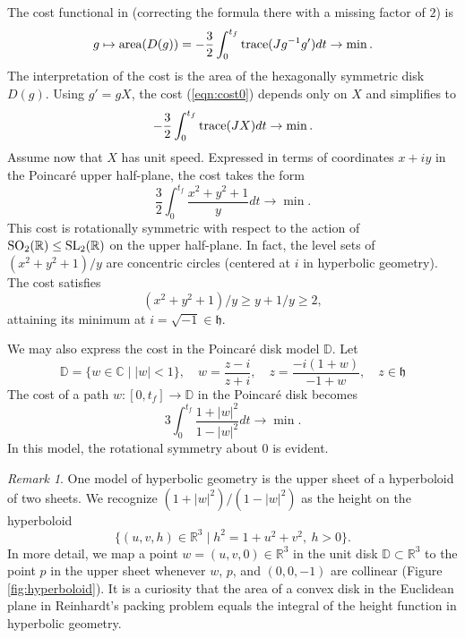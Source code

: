 \documentclass{article}
\theoremstyle{remark}
\newtheorem{remark}[equation]{Remark}%
\newcommand{\ring}[1]{\mathbb{#1}}
\newcommand{\op}[1]{\hbox{#1}}
\def\SL{\op{SL}_2(\ring{R})}
\def\SO{\op{SO}_2(\ring{R})}
\def\h{\mathfrak h}
\def\D{\ring{D}}
\begin{document}
The cost functional in \cite[\S5.1]{hales2011reinhardt} (correcting
the formula there with a missing factor of $2$) is
\begin{equation}\label{eqn:cost0}
g\mapsto \op{area}(D(g))= -\frac{3}{2}\int_0^{t_f} \op{trace} (J g^{-1} g') dt \to\min.
\end{equation}
The interpretation of the cost is the area of the hexagonally
symmetric disk $D(g)$.  Using $g' = g X$, the cost (\ref{eqn:cost0})
depends only on $X$ and simplifies to
\begin{equation}\label{eqn:cost-JX}
 -\frac{3}{2}\int_0^{t_f} 
 \op{trace}(J X) dt  \to \min.
\end{equation}
Assume now that $X$ has unit speed.
Expressed in terms of coordinates $x + i y$ in the Poincar\'e upper
half-plane, the cost takes the form
\begin{equation}\label{eqn:cost-upper}
\frac{3}{2} \int_0^{t_f} \frac{x^2 + y^2 + 1}{y} dt\to \min.
\end{equation}
This cost is rotationally symmetric with respect to the action of
$\SO\le \SL$ on the upper half-plane.  In fact, the
level sets of $(x^2 + y^2 + 1)/y$ are concentric circles (centered at
$i$ in hyperbolic geometry).  The cost satisfies
\begin{equation}\label{eqn:cost-min}
(x^2 + y^2 + 1)/y \ge y + 1/y \ge 2,
\end{equation}
attaining its minimum at $i = \sqrt{-1}\in \h$.

We may also express the cost in the Poincar\'e disk model $\D$.  Let
\[
\D=\{w\in\ring{C} \mid |w| < 1\},\quad 
w = \frac{z - i}{z + i},\quad z = \frac{-i(1+w)}{-1+w},\quad z\in\h
\]
The cost of a
path $w:[0,t_f]\to \D$ in the Poincar\'e disk becomes
\begin{equation}\label{eqn:cost-disk}
3\int_0^{t_f} \frac{1 + |w|^2}{1 - |w|^2} dt\to\min.
\end{equation}
In this model, the rotational symmetry about $0$ is evident.

\begin{remark}
  One model of hyperbolic geometry is the upper sheet of a hyperboloid
  of two sheets.  We recognize $(1+|w|^2)/(1 - |w|^2)$ as the height
  on the hyperboloid \[ \{(u,v,h)\in \ring{R}^3\mid h^2 = 1 + u^2 +
  v^2,\ h>0\}.
 \]
 In more detail, we map a point $w=(u,v,0)\in\ring{R}^3$ in the unit
 disk $\D\subset \ring{R}^3$ to the point $p$ in the upper sheet whenever $w$, $p$, and
 $(0,0,-1)$ are collinear (Figure \ref{fig:hyperboloid}).  It is a
 curiosity that the area of a convex disk in the Euclidean plane in
 Reinhardt's packing problem equals the integral of the height
 function in hyperbolic geometry.
\end{remark}
\end{document}
